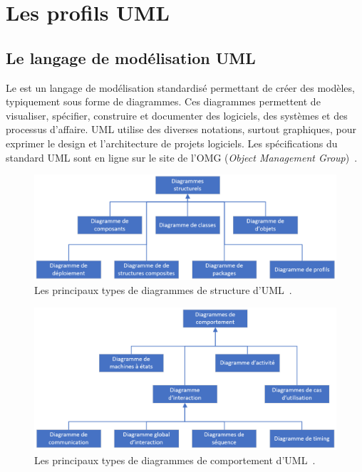 \chapter{Les profils UML}
\label{profils-UML.sect}
\section{Le langage de modélisation UML}

Le  est un langage de modélisation standardisé permettant de créer des mod\`eles, typiquement sous forme de diagrammes.
Ces diagrammes permettent de visualiser, spécifier, construire et documenter des logiciels, des systèmes et des processus d'affaire.
UML utilise des diverses notations,  surtout graphiques, pour exprimer le design et l'architecture de projets logiciels.
Les spécifications du standard UML sont en ligne sur le site de l'OMG (\emph{Object Management Group})~\cite{OMG_UML}.


\begin{figure}
    \centering
    \includegraphics[width=12cm]{10_img/chap4/structure.PNG}
    \caption{Les principaux types de diagrammes de structure d'UML~\cite{OMG_UML}.}
    \label{fig.uml_struc}
\end{figure}

\begin{figure}
    \centering
    \includegraphics[width=12cm]{10_img/chap4/comportement.PNG}
    \caption{Les principaux types de diagrammes de comportement d'UML~\cite{OMG_UML}.}
    \label{fig.uml_comp}
\end{figure}


